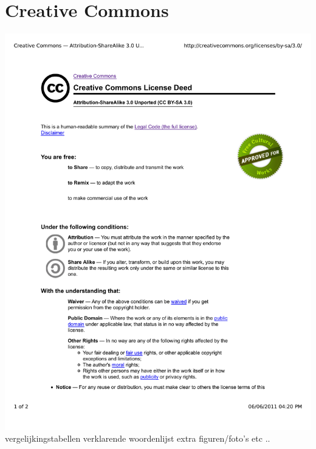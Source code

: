 \chapter{Creative Commons}
\includegraphics[scale=0.6]{src/cc-by-sa.pdf}
vergelijkingstabellen
verklarende woordenlijst
extra figuren/foto's
etc ..
